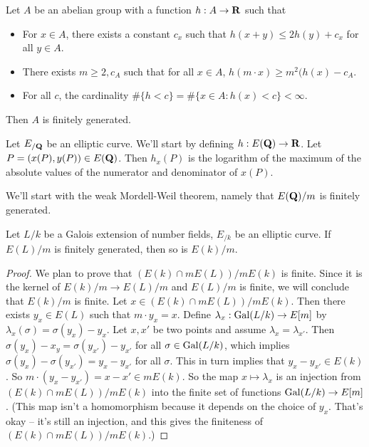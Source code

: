 \begin{proposition}\label{prop:height-abelian}
Let $A$ be an abelian group with a function $h:A\to \mathbf{R}$ such that 
\begin{itemize}
\item For $x\in A$, there exists a constant $c_x$ such that 
$h(x+y)\leqslant 2h(y)+c_x$ for all $y\in A$. 

\item There exists $m\geqslant 2,c_A$ such that for all $x\in A$, 
$h(m\cdot x)\geqslant m^2(h(x)-c_A$.

\item For all $c$, the cardinality $\#\{h<c\}=\#\{x\in A:h(x)<c\}<\infty$. 
\end{itemize}
Then $A$ is finitely generated. 
\end{proposition}

Let $E_{/\mathbf{Q}}$ be an elliptic curve. We'll start by defining $h:E(\mathbf{Q})\to \mathbf{R}$. 
Let $P=(x(P),y(P))\in E(\mathbf{Q})$. Then $h_x(P)$ is the logarithm of the maximum 
of the absolute values of the numerator and denominator of $x(P)$. 

We'll start with the weak Mordell-Weil theorem, namely that $E(\mathbf{Q})/m$ is 
finitely generated. 

\begin{lemma}
Let $L/k$ be a Galois extension of number fields, $E_{/k}$ be an elliptic 
curve. If $E(L)/m$ is finitely generated, then so is $E(k)/m$. 
\end{lemma}
\begin{proof}
We plan to prove that $(E(k)\cap m E(L))/m E(k)$ is finite. Since it is the 
kernel of $E(k)/m\to E(L)/m$ and $E(L)/m$ is finite, we will conclude that 
$E(k)/m$ is finite. Let $x\in (E(k)\cap m E(L))/m E(k)$. Then there exists 
$y_x\in E(L)$ such that $m\cdot y_x=x$. Define $\lambda_x:\operatorname{Gal}(L/k)\to E[m]$ 
by $\lambda_x(\sigma)=\sigma(y_x)-y_x$. Let $x,x'$ be two points and assume 
$\lambda_x=\lambda_{x'}$. Then $\sigma(y_x)-x_y=\sigma(y_{x'})-y_{x'}$ for all 
$\sigma \in \operatorname{Gal}(L/k)$, which implies 
$\sigma(y_x)-\sigma(y_{x'})=y_x-y_{x'}$ for all $\sigma$. This in turn 
implies that $y_x-y_{x'}\in E(k)$. So $m\cdot(y_x-y_{x'})=x-x'\in mE(k)$. So the 
map $x\mapsto \lambda_x$ is an injection from $(E(k)\cap m E(L))/m E(k)$ into 
the finite set of functions $\operatorname{Gal}(L/k)\to E[m]$. (This map isn't a 
homomorphism because it depends on the choice of $y_x$. That's okay -- it's 
still an injection, and this gives the finiteness of 
$(E(k)\cap m E(L))/mE(k)$.)  
\end{proof}

